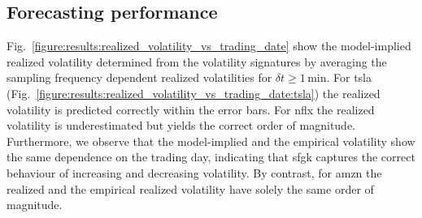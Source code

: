 \documentclass[11pt, a4paper]{thesis}  %
\begin{document}


\subsection{Forecasting performance}
Fig.~\ref{figure:results:realized_volatility_vs_trading_date} show the model-implied realized volatility determined from the volatility signatures by averaging the sampling frequency dependent realized volatilities for $\delta t \ge 1\,$min. For \ac{tsla} (Fig.~\ref{figure:results:realized_volatility_vs_trading_date:tsla}) the realized volatility is predicted correctly within the error bars. For \ac{nflx} the realized volatility is underestimated but yields the correct order of magnitude. Furthermore, we observe that the model-implied and the empirical volatility show the same dependence on the trading day, indicating that \ac{sfgk} captures the correct behaviour of increasing and decreasing volatility. By contrast, for \ac{amzn} the realized and the empirical realized volatility have solely the same order of magnitude. 

%
%
\end{document}
